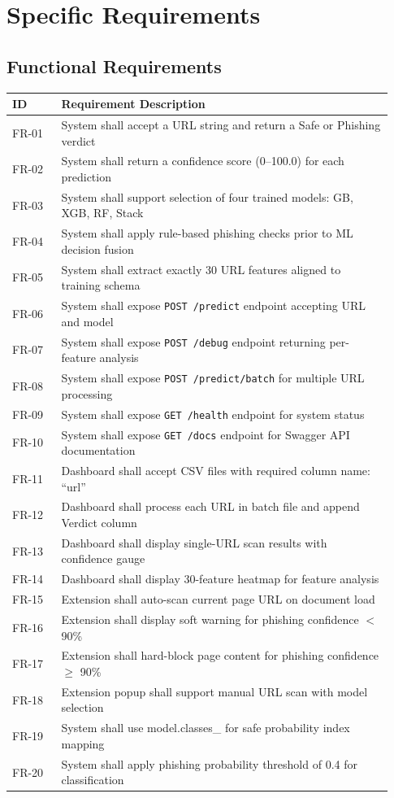 \documentclass[12pt,a4paper]{report}
\begin{document}
\section{Specific Requirements}

\subsection{Functional Requirements}

\begin{longtable}{p{0.12\linewidth}p{0.81\linewidth}}
\toprule
\textbf{ID} & \textbf{Requirement Description} \\
\midrule
FR-01 & System shall accept a URL string and return a Safe or Phishing verdict \\
FR-02 & System shall return a confidence score (0--100.0) for each prediction \\
FR-03 & System shall support selection of four trained models: GB, XGB, RF, Stack \\
FR-04 & System shall apply rule-based phishing checks prior to ML decision fusion \\
FR-05 & System shall extract exactly 30 URL features aligned to training schema \\
FR-06 & System shall expose \texttt{POST /predict} endpoint accepting URL and model \\
FR-07 & System shall expose \texttt{POST /debug} endpoint returning per-feature analysis \\
FR-08 & System shall expose \texttt{POST /predict/batch} for multiple URL processing \\
FR-09 & System shall expose \texttt{GET /health} endpoint for system status \\
FR-10 & System shall expose \texttt{GET /docs} endpoint for Swagger API documentation \\
FR-11 & Dashboard shall accept CSV files with required column name: ``url'' \\
FR-12 & Dashboard shall process each URL in batch file and append Verdict column \\
FR-13 & Dashboard shall display single-URL scan results with confidence gauge \\
FR-14 & Dashboard shall display 30-feature heatmap for feature analysis \\
FR-15 & Extension shall auto-scan current page URL on document load \\
FR-16 & Extension shall display soft warning for phishing confidence $<$ 90\% \\
FR-17 & Extension shall hard-block page content for phishing confidence $\geq$ 90\% \\
FR-18 & Extension popup shall support manual URL scan with model selection \\
FR-19 & System shall use model.classes\_ for safe probability index mapping \\
FR-20 & System shall apply phishing probability threshold of 0.4 for classification \\
\bottomrule
\end{longtable}
\end{document}
